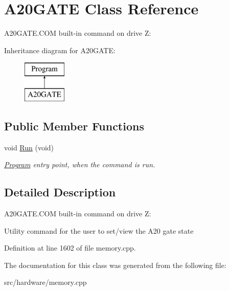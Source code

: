 \hypertarget{classA20GATE}{\section{A20\-G\-A\-T\-E Class Reference}
\label{classA20GATE}
}


A20\-G\-A\-T\-E.\-C\-O\-M built-\/in command on drive Z\-:  


Inheritance diagram for A20\-G\-A\-T\-E\-:\begin{figure}[H]
\begin{center}
\leavevmode
\includegraphics[height=2.000000cm]{classA20GATE}
\end{center}
\end{figure}
\subsection*{Public Member Functions}
\begin{DoxyCompactItemize}
\item 
\hypertarget{classA20GATE_a7d53ddb7d6453f710b7e829b5c0f6ca3}{void \hyperlink{classA20GATE_a7d53ddb7d6453f710b7e829b5c0f6ca3}{Run} (void)}\label{classA20GATE_a7d53ddb7d6453f710b7e829b5c0f6ca3}

\begin{DoxyCompactList}\small\item\em \hyperlink{classProgram}{Program} entry point, when the command is run. \end{DoxyCompactList}\end{DoxyCompactItemize}


\subsection{Detailed Description}
A20\-G\-A\-T\-E.\-C\-O\-M built-\/in command on drive Z\-: 

Utility command for the user to set/view the A20 gate state 

Definition at line 1602 of file memory.\-cpp.



The documentation for this class was generated from the following file\-:\begin{DoxyCompactItemize}
\item 
src/hardware/memory.\-cpp\end{DoxyCompactItemize}
